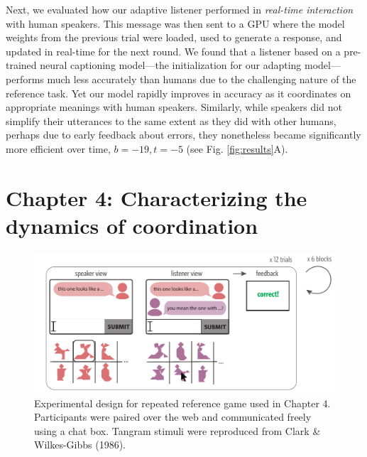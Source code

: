 \documentclass[11pt]{article}
\begin{document}
Next, we evaluated how our adaptive listener performed in \emph{real-time interaction} with human speakers. 
This message was then sent to a GPU where the model weights from the previous trial were loaded, used to generate a response, and updated in real-time for the next round.
We found that a listener based on a pre-trained neural captioning model---the initialization for our adapting model---performs much less accurately than humans due to the challenging nature of the reference task. 
Yet our model rapidly improves in accuracy as it coordinates on appropriate meanings with human speakers.
Similarly, while speakers did not simplify their utterances to the same extent as they did with other humans, perhaps due to early feedback about errors, they nonetheless became significantly more efficient over time, $b = -19, t = -5$ (see Fig. \ref{fig:results}A).




\section*{Chapter 4: Characterizing the dynamics of coordination} 

\begin{figure}[t!]
\centering
\includegraphics[scale=.93]{chapter4}
\caption{\small Experimental design for repeated reference game used in Chapter 4.  Participants were paired over the web and communicated freely using a chat box. Tangram stimuli were reproduced from Clark \& Wilkes-Gibbs (1986).}
\label{fig:chapter4}
\end{figure}

\end{document}
